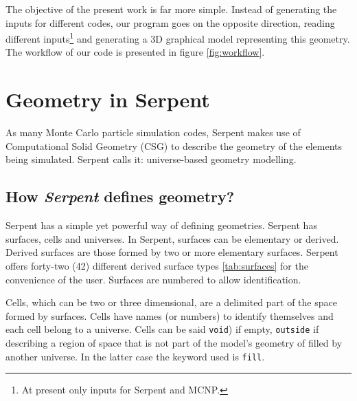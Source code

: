 \documentclass{elsarticle}
\begin{document}
The objective of the present work is far more simple. Instead of generating the inputs for
different codes, our program goes on the opposite direction, reading different
inputs\footnote{At present only inputs for Serpent and MCNP.} and generating
a 3D graphical model representing this geometry. The workflow of our code is presented
in figure \ref{fig:workflow}.

\section{Geometry in Serpent}

As many Monte Carlo particle simulation codes, Serpent makes use of Computational Solid Geometry (CSG) to
describe the geometry of the elements being simulated. Serpent calls it: universe-based geometry modelling.



\subsection{How \textit{Serpent} defines geometry?}

Serpent has a simple yet powerful way of defining geometries. Serpent has 
surfaces, cells and universes. In Serpent, surfaces can be elementary or 
derived. Derived surfaces are those formed by two or more elementary surfaces. 
Serpent offers forty-two (42) different derived surface types \ref{tab:surfaces} for the convenience of the user. Surfaces are numbered to allow identification.

Cells, which can be two or three dimensional, are a delimited part of the space 
formed by surfaces. Cells have names (or numbers) to identify themselves and 
each cell belong to a universe. Cells can be said \texttt{void}) if 
empty, \texttt{outside} if describing a region of space that is not part 
of the model's geometry of filled by another universe. In the latter case the 
keyword used is \texttt{fill}.
\end{document}
